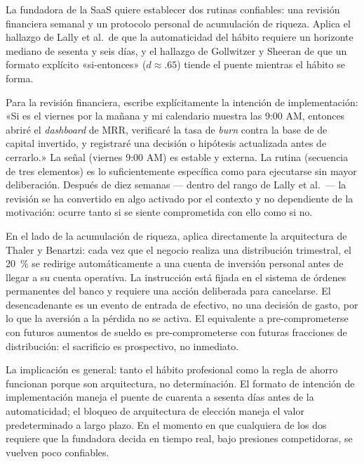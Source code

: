 \begin{example}
La fundadora de la SaaS quiere establecer dos rutinas confiables: una revisión financiera semanal
y un protocolo personal de acumulación de riqueza. Aplica el hallazgo de Lally et al.\ de que
la automaticidad del hábito requiere un horizonte mediano de sesenta y seis días, y el hallazgo
de Gollwitzer y Sheeran de que un formato explícito «si-entonces» ($d \approx .65$) tiende el
puente mientras el hábito se forma.

Para la revisión financiera, escribe explícitamente la intención de implementación: «Si es el
viernes por la mañana y mi calendario muestra las 9:00 AM, entonces abriré el \emph{dashboard}
de MRR, verificaré la tasa de \emph{burn} contra la base de  de capital invertido,
y registraré una decisión o hipótesis actualizada antes de cerrarlo.» La señal (viernes 9:00 AM)
es estable y externa. La rutina (secuencia de tres elementos) es lo suficientemente específica
como para ejecutarse sin mayor deliberación. Después de diez semanas --- dentro del rango de
Lally et al.\ --- la revisión se ha convertido en algo activado por el contexto y no dependiente
de la motivación: ocurre tanto si se siente comprometida con ello como si no.

En el lado de la acumulación de riqueza, aplica directamente la arquitectura de Thaler y
Benartzi: cada vez que el negocio realiza una distribución trimestral, el \qty{20}{\percent} se
redirige automáticamente a una cuenta de inversión personal antes de llegar a su cuenta operativa.
La instrucción está fijada en el sistema de órdenes permanentes del banco y requiere una acción
deliberada para cancelarse. El desencadenante es un evento de entrada de efectivo, no una
decisión de gasto, por lo que la aversión a la pérdida no se activa. El equivalente a
pre-comprometerse con futuros aumentos de sueldo es pre-comprometerse con futuras fracciones de
distribución: el sacrificio es prospectivo, no inmediato.

La implicación es general: tanto el hábito profesional como la regla de ahorro funcionan porque
son arquitectura, no determinación. El formato de intención de implementación maneja el puente
de cuarenta a sesenta días antes de la automaticidad; el bloqueo de arquitectura de elección
maneja el valor predeterminado a largo plazo. En el momento en que cualquiera de los dos requiere
que la fundadora decida en tiempo real, bajo presiones competidoras, se vuelven poco confiables.
\end{example}

